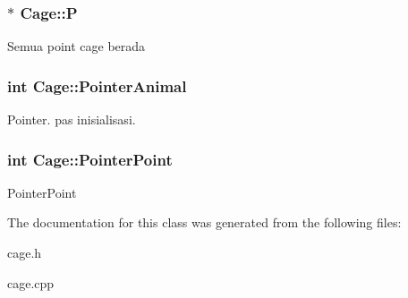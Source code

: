 \subsubsection[{\texorpdfstring{P}{P}}]{$\ast$ Cage\+::P\hspace{0.3cm}{\ttfamily [protected]}}\hypertarget{class_cage_a89c2490b6f2a07413b68922ba20facb9}{}\label{class_cage_a89c2490b6f2a07413b68922ba20facb9}
Semua point cage berada 
\subsubsection[{\texorpdfstring{Pointer\+Animal}{PointerAnimal}}]{\setlength{\rightskip}{0pt plus 5cm}int Cage\+::\+Pointer\+Animal\hspace{0.3cm}{\ttfamily [protected]}}\hypertarget{class_cage_ab909423b207293975f4f486849e46db7}{}\label{class_cage_ab909423b207293975f4f486849e46db7}
Pointer. pas inisialisasi. 
\subsubsection[{\texorpdfstring{Pointer\+Point}{PointerPoint}}]{\setlength{\rightskip}{0pt plus 5cm}int Cage\+::\+Pointer\+Point\hspace{0.3cm}{\ttfamily [protected]}}\hypertarget{class_cage_abfa1de5ec469c33b6495d2e5343b2ac1}{}\label{class_cage_abfa1de5ec469c33b6495d2e5343b2ac1}
Pointer\+Point 

The documentation for this class was generated from the following files\+:\begin{DoxyCompactItemize}
\item 
cage.\+h\item 
cage.\+cpp\end{DoxyCompactItemize}
